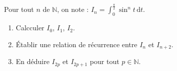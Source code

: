 
\begin{exercice}\label{exoautoanalyseCTU-29}


  Pour tout $n$ de $\mathbb{N}$, on note : $I_{n} = \displaystyle\int_0^{\frac{\pi}2} \sin ^n t\, \mathrm dt$.
    \begin{enumerate}
    \item Calcculer $I_{0}$, $I_{1}$, $I_{2}$.
        \item Établir une relation de récurrence entre $I_{n}$ et $I_{n + 2}$.
        \item En déduire $I_{2p}$ et $I_{2p + 1}$ pour tout $p \in \mathbb{N}$.
    \end{enumerate}





\end{exercice}
